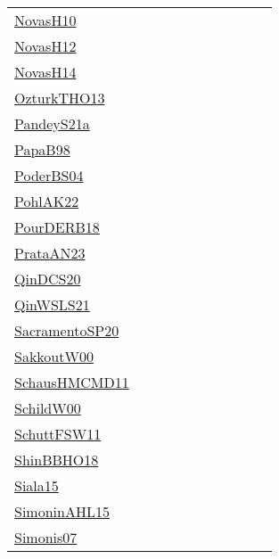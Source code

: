 {\begin{longtable}{p{3cm}p{4cm}p{2cm}p{2cm}p{2cm}p{2cm}p{2cm}p{2cm}p{2cm}p{2cm}}
\href{articles/NovasH10.pdf}{NovasH10}~\cite{NovasH10} &  &  &  &  &  &  &  &  & \\
\href{articles/NovasH12.pdf}{NovasH12}~\cite{NovasH12} &  &  &  &  &  &  &  &  & \\
\href{articles/NovasH14.pdf}{NovasH14}~\cite{NovasH14} &  &  &  &  &  &  &  &  & \\
\href{articles/OzturkTHO13.pdf}{OzturkTHO13}~\cite{OzturkTHO13} &  &  &  &  &  &  &  &  & \\
\href{articles/PandeyS21a.pdf}{PandeyS21a}~\cite{PandeyS21a} &  &  &  &  &  &  &  &  & \\
\href{articles/PapaB98.pdf}{PapaB98}~\cite{PapaB98} &  &  &  &  &  &  &  &  & \\
\href{articles/PoderBS04.pdf}{PoderBS04}~\cite{PoderBS04} &  &  &  &  &  &  &  &  & \\
\href{articles/PohlAK22.pdf}{PohlAK22}~\cite{PohlAK22} &  &  &  &  &  &  &  &  & \\
\href{articles/PourDERB18.pdf}{PourDERB18}~\cite{PourDERB18} &  &  &  &  &  &  &  &  & \\
\href{articles/PrataAN23.pdf}{PrataAN23}~\cite{PrataAN23} &  &  &  &  &  &  &  &  & \\
\href{articles/QinDCS20.pdf}{QinDCS20}~\cite{QinDCS20} &  &  &  &  &  &  &  &  & \\
\href{articles/QinWSLS21.pdf}{QinWSLS21}~\cite{QinWSLS21} &  &  &  &  &  &  &  &  & \\
\href{articles/SacramentoSP20.pdf}{SacramentoSP20}~\cite{SacramentoSP20} &  &  &  &  &  &  &  &  & \\
\href{articles/SakkoutW00.pdf}{SakkoutW00}~\cite{SakkoutW00} &  &  &  &  &  &  &  &  & \\
\href{articles/SchausHMCMD11.pdf}{SchausHMCMD11}~\cite{SchausHMCMD11} &  &  &  &  &  &  &  &  & \\
\href{articles/SchildW00.pdf}{SchildW00}~\cite{SchildW00} &  &  &  &  &  &  &  &  & \\
\href{articles/SchuttFSW11.pdf}{SchuttFSW11}~\cite{SchuttFSW11} &  &  &  &  &  &  &  &  & \\
\href{articles/ShinBBHO18.pdf}{ShinBBHO18}~\cite{ShinBBHO18} &  &  &  &  &  &  &  &  & \\
\href{articles/Siala15.pdf}{Siala15}~\cite{Siala15} &  &  &  &  &  &  &  &  & \\
\href{articles/SimoninAHL15.pdf}{SimoninAHL15}~\cite{SimoninAHL15} &  &  &  &  &  &  &  &  & \\
\href{articles/Simonis07.pdf}{Simonis07}~\cite{Simonis07} &  &  &  &  &  &  &  &  & \\

\end{longtable}}
